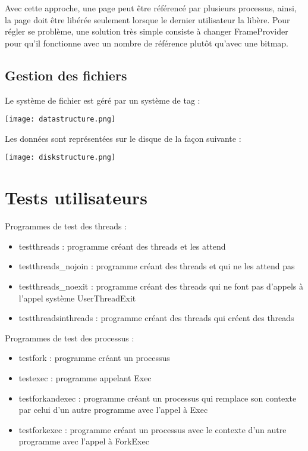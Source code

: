 \documentclass{article}
\begin{document}
Avec cette approche, une page peut être référencé par plusieurs processus, ainsi, la page doit être libérée seulement lorsque le dernier utilisateur la libère.  Pour régler se problème, une solution très simple consiste à changer FrameProvider pour qu'il fonctionne avec un nombre de référence plutôt qu'avec une bitmap.
\subsection{Gestion des fichiers}
Le système de fichier est géré par un système de tag :

\begin{center}
\texttt{[image: datastructure.png]}
\end{center}

Les données sont représentées sur le disque de la façon suivante :

\begin{center}
\texttt{[image: diskstructure.png]}
\end{center}



\section{Tests utilisateurs}

Programmes de test des threads :

\begin{itemize}
  \item testthreads : programme créant des threads et les attend
  \item testthreads\_nojoin : programme créant des threads et qui ne les attend pas
  \item testthreads\_noexit : programme créant des threads qui ne font pas d'appels à l'appel
  système UserThreadExit
  \item testthreadsinthreads : programme créant des threads qui créent des threads

\end{itemize}

Programmes de test des processus :

\begin{itemize}
  \item testfork : programme créant un processus
  \item testexec : programme appelant Exec
  \item testforkandexec : programme créant un processus qui remplace son contexte par celui d'un autre programme avec l'appel à Exec
  \item testforkexec : programme créant un processus avec le contexte d'un autre programme avec l'appel à ForkExec
\end{itemize}
\end{document}
